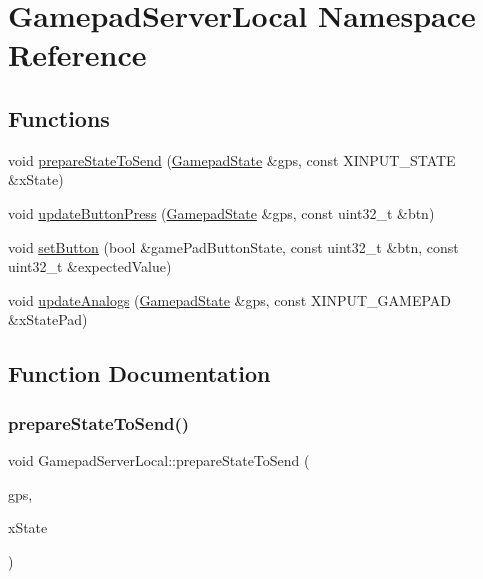 \hypertarget{namespace_gamepad_server_local}{}\section{Gamepad\+Server\+Local Namespace Reference}
\label{namespace_gamepad_server_local}
\subsection*{Functions}
\begin{DoxyCompactItemize}
\item 
void \mbox{\hyperlink{namespace_gamepad_server_local_a6741c422592dcc4aedfcdf636096b857}{prepare\+State\+To\+Send}} (\mbox{\hyperlink{class_gamepad_state}{Gamepad\+State}} \&gps, const X\+I\+N\+P\+U\+T\+\_\+\+S\+T\+A\+TE \&x\+State)
\item 
void \mbox{\hyperlink{namespace_gamepad_server_local_a1235679a5db743af26af2f68a2dcd3ce}{update\+Button\+Press}} (\mbox{\hyperlink{class_gamepad_state}{Gamepad\+State}} \&gps, const uint32\+\_\+t \&btn)
\item 
void \mbox{\hyperlink{namespace_gamepad_server_local_a7ee9b0c4e1440fc1fc6cb45ac2cbf894}{set\+Button}} (bool \&game\+Pad\+Button\+State, const uint32\+\_\+t \&btn, const uint32\+\_\+t \&expected\+Value)
\item 
void \mbox{\hyperlink{namespace_gamepad_server_local_ae4392d183dc4e4a3743925fdbed23a0e}{update\+Analogs}} (\mbox{\hyperlink{class_gamepad_state}{Gamepad\+State}} \&gps, const X\+I\+N\+P\+U\+T\+\_\+\+G\+A\+M\+E\+P\+AD \&x\+State\+Pad)
\end{DoxyCompactItemize}


\subsection{Function Documentation}
\mbox{\label{namespace_gamepad_server_local_a6741c422592dcc4aedfcdf636096b857}} 
\subsubsection{\texorpdfstring{prepare\+State\+To\+Send()}{prepareStateToSend()}}
{\footnotesize\ttfamily void Gamepad\+Server\+Local\+::prepare\+State\+To\+Send (\begin{DoxyParamCaption}\item[{\mbox{\hyperlink{class_gamepad_state}{Gamepad\+State}} \&}]{gps,  }\item[{const X\+I\+N\+P\+U\+T\+\_\+\+S\+T\+A\+TE \&}]{x\+State }\end{DoxyParamCaption})}

